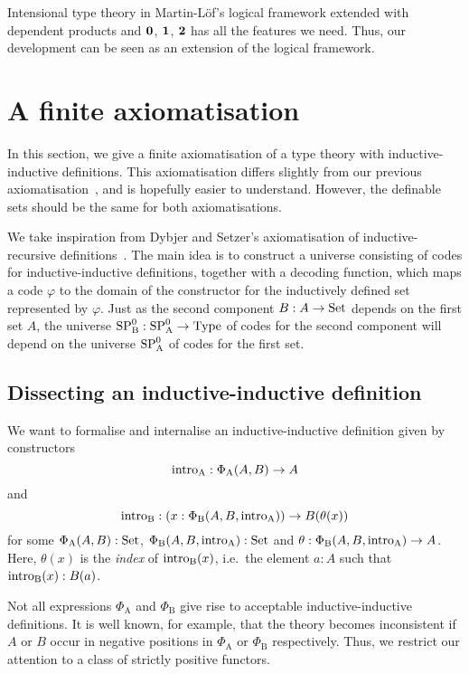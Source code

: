 \documentclass{article}
\begin{document}
Intensional type theory in Martin-L\"of's logical framework extended with
dependent products and $\mathbf{0}$, $\mathbf{1}$, $\mathbf{2}$
 has all the features we
need. Thus, our development can be seen as an extension of
the logical framework.

\section{A finite axiomatisation}
\label{sec:axiomatisation}
 

In this section, we give a finite axiomatisation of a type theory with
inductive-inductive definitions. This axiomatisation differs slightly
from our previous
axiomatisation~\cite{nordvallforsbergSetzer2010indind}, and is
hopefully easier to understand. However, the definable sets should
be the same for both axiomatisations.


We take inspiration from Dybjer and Setzer's axiomatisation of
inductive-recursive definitions~\cite{dybjersetzer1999finax}. The main
idea is to construct a universe consisting of codes for
inductive-inductive definitions, together with a decoding function,
which maps a code $\varphi$ to the domain of the constructor for the
inductively defined set represented by $\varphi$.  Just as the second
component $B : A \to \text{Set}$ depends on the first set $A$, the universe $\text{SP}^{0}_{\mathrm{B}} : \text{SP}^{0}_{\mathrm{A}} \to \text{Type}$
of codes for the second component will depend on the universe $\text{SP}^{0}_{\mathrm{A}}$ of codes
for the first set.

\subsection{Dissecting an inductive-inductive definition}
\label{sec:dissect-ind}

We want to formalise and internalise an inductive-inductive definition
given by constructors
\[
\text{intro}_{\mathrm{A}} : \Phi_{\mathrm{A}}(A, B) \to A
\]
and
\[
\text{intro}_{\mathrm{B}} : (x : \Phi_{\mathrm{B}}(A, B, \text{intro}_{\mathrm{A}})) \to B(\theta(x))
\]
for some $\Phi_{\mathrm{A}}(A, B) : \text{Set}$, $\Phi_{\mathrm{B}}(A, B,
\text{intro}_{\mathrm{A}}) : \text{Set}$ and $\theta : \Phi_{\mathrm{B}}(A, B, \text{intro}_{\mathrm{A}}) \to
A$.
Here, $\theta(x)$ is the \emph{index} of $\text{intro}_{\mathrm{B}}(x)$, i.e.\ the element $a :
A$ such that $\text{intro}_{\mathrm{B}}(x) : B(a)$.

Not all expressions $\Phi_{\mathrm{A}}$ and $\Phi_{\mathrm{B}}$ give
rise to acceptable inductive-inductive definitions. It is well known,
for example, that the theory becomes inconsistent if $A$ or $B$ occur
in negative positions in $\Phi_{\mathrm{A}}$ or $\Phi_{\mathrm{B}}$
respectively. Thus, we restrict our attention to a class of strictly
positive functors.
\end{document}
